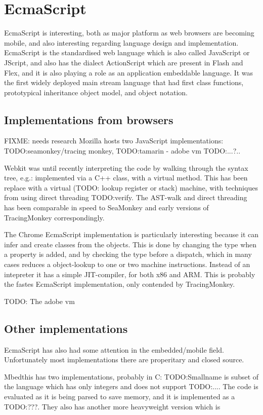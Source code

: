 \section{EcmaScript}

EcmaScript is interesting, both as major platform as web browsers are becoming mobile, and also interesting regarding language design and implementation.
EcmaScript is the standardised web language which is also called JavaScript or JScript, and also has the dialect ActionScript which are present in Flash and Flex, and it is also playing a role as an application embeddable language. 
It was the first widely deployed main stream language that had first class functions, prototypical inheritance object model, and object notation.

\subsection{Implementations from browsers}
FIXME: needs research
Mozilla hosts two JavaScript implementations: 
TODO:seamonkey/tracing monkey, 
TODO:tamarin - adobe vm
TODO:...?..


Webkit was until recently interpreting the code by walking through the syntax tree, e.g.: implemented via a C++ class, with a virtual method. 
This has been replace with a virtual (TODO: lookup register or stack) machine, with techniques from \cite{TODO:ertl,and,more} using direct threading TODO:verify. 
The AST-walk and direct threading has been comparable in speed to SeaMonkey and early versions of TracingMonkey correspondingly.

The Chrome EcmaScript implementation is particularly interesting because it can infer and create classes from the objects. This is done by changing the type when a property is added, and by checking the type before a dispatch, which in many cases reduces a object-lookup to one or two machine instructions. Instead of an intepreter it has a simple JIT-compiler, for both x86 and ARM. This is probably the fastes EcmaScript implementation, only contended by TracingMonkey.

TODO: The adobe vm

\subsection{Other implementations}
EcmaScript has also had some attention in the embedded/mobile field. Unfortunately most implementations there are properitary and closed source. 

Mbedthis has two implementations, probably in C: TODO:Smallname is subset of the language which has only integers and does not support TODO:.... The code is evaluated as it is being parsed to save memory, and it is implemented as a TODO:???. 
They also has another more heavyweight version which is 

